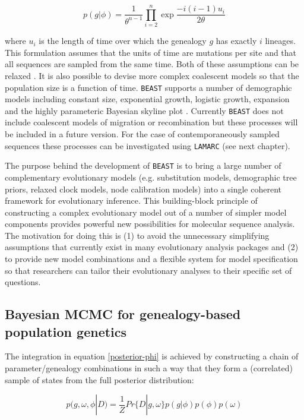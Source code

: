 \documentclass[cup7b, english]{cupbook}
\begin{document}
 \begin{equation}
p(g|\phi) = \frac{1}{\theta^{n-1}}\prod_{i=2}^n \exp\frac{-i(i-1)u_i}{2\theta}
\end{equation}

where $u_i$ is the length of time over which the genealogy $g$ has exactly $i$ lineages.
This formulation assumes that the units of time are mutations per site and that all
sequences are sampled from the same time. Both of these assumptions can be relaxed \cite{DNRS2002}.
It is also possible to devise more complex coalescent models so that the population size
is a function of time. \texttt{BEAST} supports a number of demographic models including
constant size, exponential growth, logistic growth, expansion and the highly parameteric
Bayesian skyline plot \cite{DRSP2005}.  Currently \texttt{BEAST} does not include coalescent models
of migration or recombination but these processes will be included in a future version. For the case of contemporaneously sampled sequences these processes can be investigated using \texttt{LAMARC} (see next chapter).

The purpose behind the development of \texttt{BEAST} is to bring a large number
of complementary evolutionary models (e.g. substitution models, demographic tree priors,
 relaxed clock models, node calibration models) into a single coherent
framework for evolutionary inference. This building-block principle of constructing a complex
evolutionary model out of a number of simpler model components provides
powerful new possibilities for molecular sequence analysis. The motivation
for doing this is (1) to avoid the unnecessary simplifying assumptions
that currently exist in many evolutionary analysis packages and (2)
to provide new model combinations and a flexible system for model
specification so that researchers can tailor their evolutionary analyses
to their specific set of questions.

\subsection{Bayesian MCMC for genealogy-based population genetics}

The integration in equation \ref{posterior-phi} is achieved by constructing a chain of
parameter/genealogy combinations in such a way that they form a (correlated) sample
of states from the full posterior distribution:

\begin{equation}
p(g, \omega, \phi|D) = \frac{1}{Z} Pr\{D|g, \omega\}p(g|\phi)p(\phi)p(\omega)
\end{equation}
\end{document}
